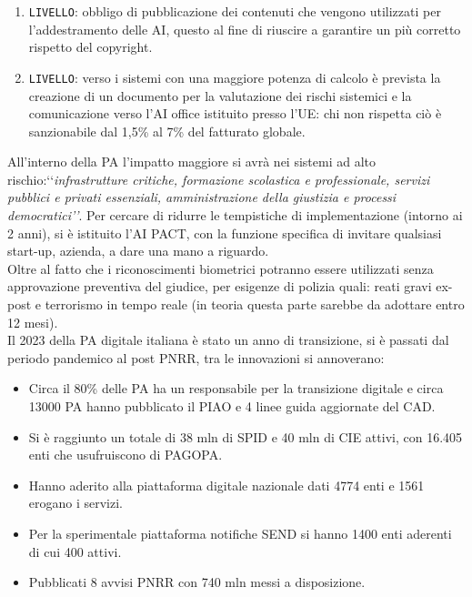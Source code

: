 \documentclass{article}
\begin{document}
\begin{justify}
\begin{itemize}
        \begin{enumerate}
            \item \texttt{LIVELLO}: obbligo di pubblicazione dei contenuti che vengono utilizzati per \\l'addestramento delle AI, questo al fine di riuscire a garantire un più corretto rispetto del copyright.
            \item \texttt{LIVELLO}: verso i sistemi con una maggiore potenza di calcolo è prevista la creazione di un documento per la valutazione dei rischi sistemici e la comunicazione verso l'AI office istituito presso l'UE: chi non rispetta ciò è sanzionabile dal 1,5\% al 7\% del fatturato globale.\citep{La_repubblica} 
        \end{enumerate}
    \end{itemize}
    All'interno della PA l'impatto maggiore si avrà nei sistemi ad alto rischio:‘‘\textit{infrastrutture critiche, formazione scolastica e professionale, servizi pubblici e privati essenziali, amministrazione della giustizia e processi democratici’’}. Per cercare di ridurre le tempistiche di implementazione (intorno ai 2 anni), si è istituito l'AI PACT, con la funzione specifica di invitare qualsiasi start-up, azienda, a dare una mano a riguardo.\citep{marchetti_ai_2023}\\
    Oltre al fatto che i riconoscimenti biometrici potranno essere utilizzati senza approvazione preventiva del giudice, per esigenze di polizia quali: reati gravi ex-post e terrorismo in tempo reale (in teoria questa parte sarebbe da adottare entro 12 mesi).\\
    Il 2023 della PA digitale italiana è stato un anno di transizione, si è passati dal periodo pandemico al post PNRR, tra le innovazioni si annoverano:
    \begin{itemize}
        \item Circa il 80\% delle PA ha un responsabile per la transizione digitale e circa 13000 PA hanno pubblicato il PIAO e 4 linee guida aggiornate del CAD.
        \item Si è raggiunto un totale di 38 mln di SPID e 40 mln di CIE attivi, con 16.405 enti che usufruiscono di PAGOPA.
        \item Hanno aderito alla piattaforma digitale nazionale dati 4774 enti e 1561 erogano i servizi.
        \item Per la sperimentale piattaforma notifiche SEND si hanno 1400 enti aderenti di cui 400 attivi.
        \item Pubblicati 8 avvisi PNRR con 740 mln messi a disposizione.\citep{AttuazionePNRR}
    \end{itemize}
\end{justify}
\end{document}
